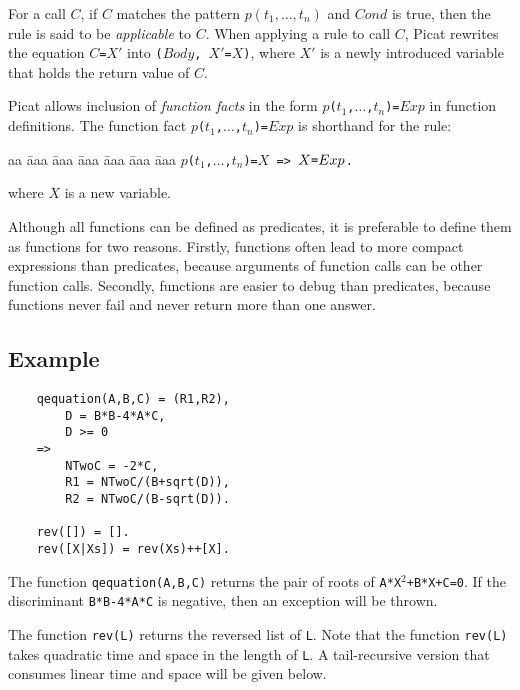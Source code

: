 For a call $C$, if $C$ matches the pattern $p(t_1,\ldots,t_n)$ and $Cond$ is true, then the rule is said to be \emph{applicable} to $C$. When applying a rule to call $C$, Picat rewrites the equation $C$\verb+=+$X'$ into \texttt{($Body$, $X'$=$X$)}, where $X'$ is a newly introduced variable that holds the return value of $C$. 

Picat allows inclusion of \emph{function facts} in the form {\tt $p$($t_1$,$\ldots$,$t_n$)\verb+=+$Exp$} in function definitions. The function fact {\tt $p$($t_1$,$\ldots$,$t_n$)\verb+=+$Exp$} is shorthand for the rule:
\begin{tabbing}
aa \= aaa \= aaa \= aaa \= aaa \= aaa \= aaa \kill
\> {\tt $p$($t_1$,$\ldots$,$t_n$)\verb+=+$X$ \verb+=>+ $X\verb+=+Exp$.}
\end{tabbing}
where $X$ is a new variable.
 
Although all functions can be defined as predicates, it is preferable to define them as functions for two reasons.  Firstly, functions often lead to more compact expressions than predicates, because arguments of function calls can be other function calls.  Secondly, functions are easier to debug than predicates, because functions never fail and never return more than one answer. 

\subsection*{Example}
\begin{verbatim}
    qequation(A,B,C) = (R1,R2), 
        D = B*B-4*A*C, 
        D >= 0 
    => 
        NTwoC = -2*C,
        R1 = NTwoC/(B+sqrt(D)),
        R2 = NTwoC/(B-sqrt(D)).

    rev([]) = [].
    rev([X|Xs]) = rev(Xs)++[X].
\end{verbatim}
The function \texttt{qequation(A,B,C)} returns the pair of roots of \texttt{A*X$^2$+B*X+C=0}. If the discriminant \texttt{B*B-4*A*C} is negative, then an exception will be thrown. 

The function \texttt{rev(L)} returns the reversed list of \texttt{L}. Note that the function \texttt{rev(L)} takes quadratic time and space in the length of \texttt{L}. A tail-recursive version that consumes linear time and space will be given below.

